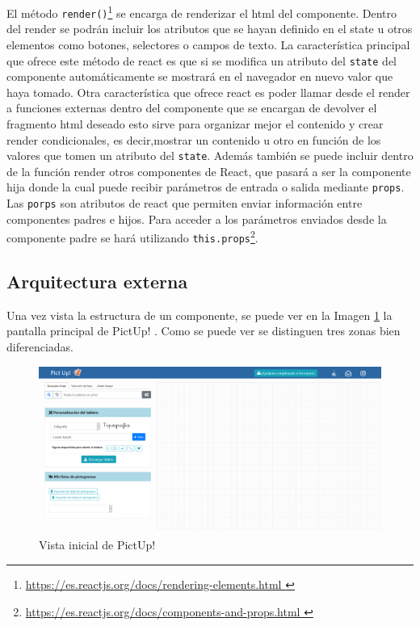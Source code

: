 El método \texttt{render()}\footnote{\url{https://es.reactjs.org/docs/rendering-elements.html }} se encarga de renderizar el html del componente. Dentro del render se podrán incluir los atributos que se hayan definido en el state u otros elementos como botones, selectores o campos de texto. 
La característica principal que ofrece este método de react es que si se modifica un atributo del \texttt{state} del componente automáticamente se mostrará en el navegador en nuevo valor que haya tomado. Otra característica que ofrece react es poder llamar desde el render a funciones externas dentro del componente que se encargan de devolver el fragmento html deseado esto sirve para organizar mejor el contenido y crear render condicionales, es decir,mostrar un contenido u otro en función de los valores que tomen un atributo del \texttt{state}.
Además también se puede incluir dentro de la función render otros componentes de React, que pasará a ser la componente hija donde la cual puede recibir parámetros de entrada o salida mediante \texttt{props}. Las \texttt{porps} son atributos de react que permiten enviar información entre componentes padres e hijos. Para acceder a los parámetros enviados desde la componente padre se hará utilizando \texttt{this.props}\footnote{\url{https://es.reactjs.org/docs/components-and-props.html }}.


\subsection{Arquitectura externa}

Una vez vista la estructura de un componente, se puede ver en la Imagen \ref{fig:pantallaprincipal} la pantalla principal de PictUp! . Como se puede ver se distinguen tres zonas bien diferenciadas. 

\begin{figure}[h!]
	\centering
	\includegraphics[width=\linewidth]{Imagenes/Bitmap/pantallaprincipal}
	\caption{Vista inicial de PictUp!
	}
	\label{fig:pantallaprincipal}
\end{figure}

